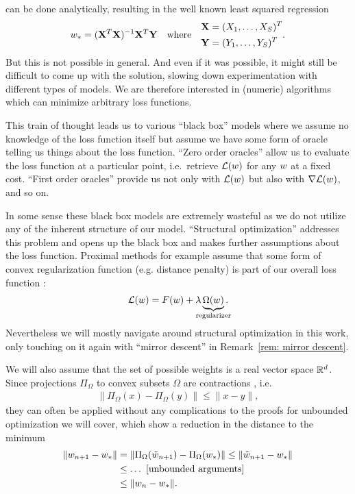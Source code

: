 can be done analytically, resulting in the well known least squared
regression
\begin{align*}
	w_* = (\mathbf{X}^T\mathbf{X})^{-1}\mathbf{X}^T\mathbf{Y} \quad \text{where}\quad 
	\begin{aligned}
		\mathbf{X}&=(X_1,\dots,X_S)^T\\
		\mathbf{Y}&=(Y_1,\dots,Y_S)^T
	\end{aligned}.
\end{align*}
But this is not possible in general. And even if it was possible, it might still
be difficult to come up with the solution, slowing down experimentation
with different types of models. We are therefore interested in (numeric)
algorithms which can minimize arbitrary loss functions.

This train of thought leads us to various ``black box'' models where we assume
no knowledge of the loss function itself but assume we have some form of oracle
telling us things about the loss function. ``Zero order oracles'' allow us to
evaluate the loss function at a particular point, i.e.\ retrieve \(\mathcal{L}(w)\)
for any \(w\) at a fixed cost. ``First order oracles'' provide us not
only with \(\mathcal{L}(w)\) but also with \(\nabla\mathcal{L}(w)\), and so on. 

In some sense these black box models are extremely wasteful as we do not utilize
any of the inherent structure of our model. ``Structural optimization'' addresses
this problem and opens up the black box and makes further assumptions about
the loss function. Proximal methods for example assume that some form of convex
regularization function (e.g. distance penalty) is part of our overall loss
function \parencite[e.g.][]{bottouOptimizationMethodsLargeScale2018}:
\begin{align*}
	\Loss(\weights)
	= F(\weights) + \lambda \underbrace{\Omega(\weights)}_{\mathclap{\text{regularizer}}}.
\end{align*}
Nevertheless we will mostly navigate around structural optimization in
this work, only touching on it again with ``mirror descent'' in
Remark~\ref{rem: mirror descent}.

We will also assume that the set of possible weights is a real
vector space \(\mathbb{R}^d\). Since projections \(\Pi_\Omega\) to convex
subsets \(\Omega\) are contractions \parencite[Lemma
3.1]{bubeckConvexOptimizationAlgorithms2015}, i.e.
\begin{align*}
	\| \Pi_\Omega(x) - \Pi_\Omega(y) \| \le \| x - y \|,
\end{align*}
they can often be applied without any complications to the proofs for unbounded
optimization we will cover, which show a reduction in the distance to the
minimum
\begin{align*}
	\|w_{n+1} - w_* \|
	&= \|\Pi_\Omega(\tilde{w}_{n+1}) - \Pi_\Omega(w_*)\|
	\le \|\tilde{w}_{n+1} - w_* \|\\
	&\le \dots \text{ [unbounded arguments] }\\
	&\le \|w_n - w_*\|.
\end{align*}

